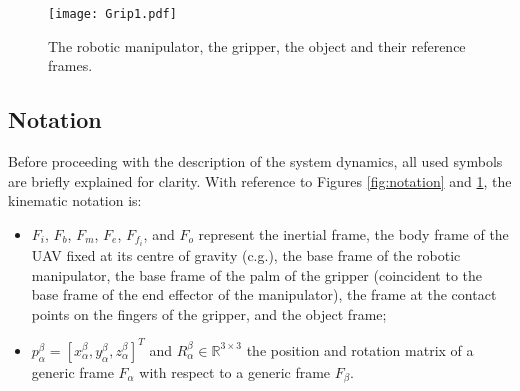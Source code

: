 \documentclass[a4paper, 10pt, conference]{ieeeconf}
\begin{document}
\begin{figure}[t]
  \centering

  \texttt{[image: Grip1.pdf]}
  \caption{The robotic manipulator, the gripper, the object and
          their reference frames.}
  \label{fig:notation2}
\end{figure}

\subsection{Notation}
Before proceeding with the description of the system dynamics, all
used symbols are briefly explained for clarity. With reference to Figures
\ref{fig:notation} and \ref{fig:notation2}, the kinematic
notation is:
\begin{itemize}
\item $F_i$, $F_b$, $F_m$, $F_e$, $F_{f_i}$, and $F_o$ represent the inertial
  frame, the body frame of the UAV fixed at its centre of gravity
  (c.g.), the base frame of the robotic manipulator, the base frame of
  the palm of the gripper (coincident to the base frame of the end
  effector of the manipulator), the frame at the contact points on the
  fingers of the gripper, and the object frame;
\item $p_\alpha^\beta = [x_\alpha^\beta, y_\alpha^\beta, z_\alpha^\beta]^T$ and $R_\alpha^\beta \in
  \mathbb{R}^{3\times3}$ the position and rotation matrix of a generic frame $F_\alpha$
   with respect to a generic frame $F_\beta$.
\end{itemize}
\end{document}

